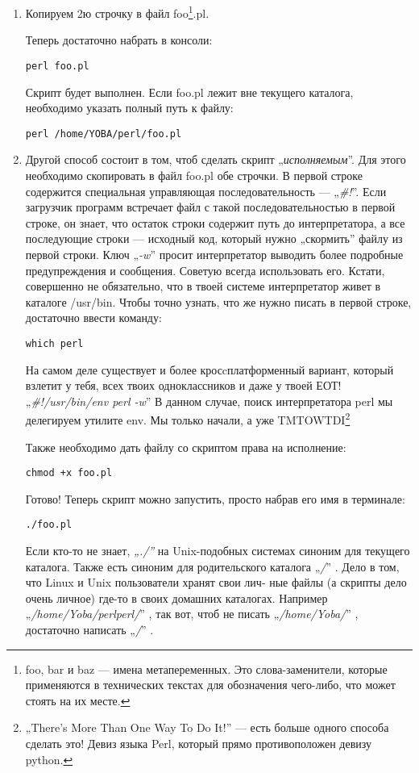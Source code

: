 \begin{enumerate}
\item Копируем 2ю строчку в файл foo\footnote{foo,
bar и baz --- имена метапеременных. Это слова-заменители, которые применяются
в технических текстах для обозначения чего-либо,
что может стоять на их месте.}.pl.

Теперь достаточно набрать в
консоли:

\texttt{perl foo.pl}

Скрипт будет выполнен. Если foo.pl лежит вне текущего каталога,
необходимо указать полный путь к файлу:

\texttt{perl /home/YOBA/perl/foo.pl}

\item Другой способ состоит в том, чтоб сделать скрипт „\emph{исполняемым}”.
Для этого необходимо скопировать в файл foo.pl обе строчки. В первой
строке содержится специальная управляющая последовательность —
„\emph{\#!}”. Если загрузчик программ встречает файл с такой последовательностью
в первой строке, он знает, что остаток строки содержит путь до интерпретатора,
а все последующие строки --- исходный код, который нужно „скормить” файлу из
первой строки.
Ключ „\emph{-w}” просит интерпретатор
выводить более подробные предупреждения и сообщения. Советую всегда
использовать его. Кстати, совершенно не обязательно, что в твоей
системе интерпретатор живет в каталоге /usr/bin. Чтобы точно узнать,
что же нужно писать в первой строке, достаточно ввести команду:

\texttt{which perl}

На самом деле существует и более кросcплатформенный вариант, который взлетит у тебя,
всех твоих одноклассников и даже у твоей ЕОТ!
„\emph{\#!/usr/bin/env perl -w}”
В данном случае, поиск интерпретатора perl мы делегируем утилите env. Мы только
начали, а уже TMTOWTDI\footnote{„There's More Than One Way To Do It!” ---
есть больше одного способа сделать это! Девиз языка Perl, который прямо противоположен
девизу python.}

Также необходимо дать файлу со скриптом права на исполнение:

\texttt{chmod +x foo.pl}

Готово! Теперь скрипт можно запустить, просто набрав его имя в терминале:

\texttt{./foo.pl}

Если кто-то не знает, \emph{„./”} на Unix-подобных системах синоним для
текущего каталога. Также есть синоним для родительского каталога
„\emph{/}” . Дело в том, что Linux и Unix пользователи хранят свои лич-
ные файлы (а скрипты дело очень личное) где-то в своих домашних
каталогах. Например „\emph{/home/Yoba/perlperl/}” , так вот, чтоб не писать
„\emph{/home/Yoba/}” , достаточно написать „\emph{/}” .


\end{enumerate}
